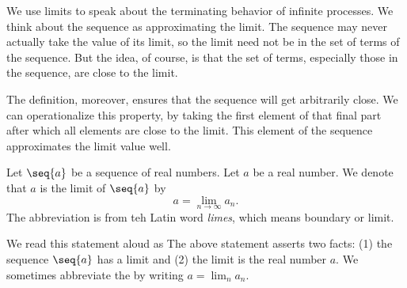 We use limits to speak about
the terminating behavior of
infinite processes.
We think about the sequence
as approximating the limit.
The sequence may never
actually take the value
of its limit, so the
limit need not be in the
set of terms of the sequence.
But the idea, of course, is that the set of terms, especially those  in the sequence, are close to the limit.

The definition, moreover,
ensures that the sequence
will get arbitrarily close.
We can operationalize this
property, by taking the first
element of that final part
after which all elements are
close to the limit.
This element of the sequence approximates the limit value well.


Let $\seq{a}$ be a sequence of real numbers.
Let $a$ be a real number.
We denote that $a$ is the limit of $\seq{a}$ by
\[
  a = \lim_{n \to \infty} a_n.
\]
The abbreviation  is from teh Latin word \textit{limes}, which means boundary or limit.

We read this statement aloud as
The above statement asserts two
facts: (1) the sequence
$\seq{a}$ has a limit and (2)
the limit is the real number $a$.
We sometimes abbreviate
the by writing
$a = \lim_{n} a_n$.

